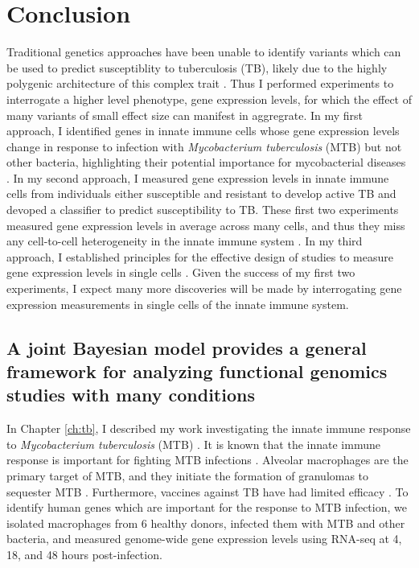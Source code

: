 \chapter{Conclusion}\label{conclusion}

Traditional genetics approaches have been unable to identify variants
which can be used to predict susceptiblity to tuberculosis (TB),
likely due to the highly polygenic architecture of this complex trait
\citep{Thye2010, Mahasirimongkol2012, Thye2012, Png2012, Chimusa2014, Curtis2015, Sobota2016}.
Thus I performed experiments to interrogate a higher level phenotype,
gene expression levels, for which the effect of many variants of small
effect size can manifest in aggregrate. In my first approach, I
identified genes in innate immune cells whose gene expression levels
change in response to infection with \emph{Mycobacterium tuberculosis}
(MTB) but not other bacteria, highlighting their potential importance
for mycobacterial diseases \citep{Blischak2015}. In my second approach, I measured gene
expression levels in innate immune cells from individuals either
susceptible and resistant to develop active TB and devoped a
classifier to predict susceptibility to TB. These first two
experiments measured gene expression levels in average across many
cells, and thus they miss any cell-to-cell heterogeneity in the innate
immune system \citep{Satija2014, Proserpio2016}. In my third approach, I established principles for the
effective design of studies to measure gene expression levels in
single cells \citep{Tung2016}. Given the success of my first two experiments, I expect
many more discoveries will be made by interrogating gene expression
measurements in single cells of the innate immune system.

\section{A joint Bayesian model provides a general framework for analyzing functional genomics studies with many conditions}

In Chapter \ref{ch:tb}, I described my work investigating the innate immune
response to \emph{Mycobacterium tuberculosis} (MTB) \citep{Blischak2015}. It is
known that the innate immune response is important for fighting MTB
infections \citep{Khan2016}. Alveolar macrophages are the primary target of MTB, and they
initiate the formation of granulomas to sequester MTB \citep{Sia2015}. Furthermore, vaccines
against TB have had limited efficacy \citep{Wang2013}. To identify human genes which are
important for the response to MTB infection, we isolated macrophages from 6
healthy donors, infected them with MTB and other bacteria, and measured
genome-wide gene expression levels using RNA-seq at 4, 18, and 48 hours
post-infection.


